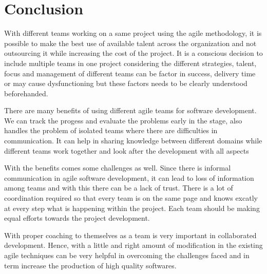 \documentclass[sigconf]{acmart}
\begin{document}
\section{Conclusion}
With different teams working on a same project using the agile methodology, it is possible to make the best use of available talent across the organization and not outsourcing it while increasing the cost of the project. It is a conscious decision to include multiple teams in one project considering the different strategies, talent, focus and management of different teams can be factor in success, delivery time or may cause dysfunctioning but these factors needs to be clearly understood beforehanded.

There are many benefits of using different agile teams for software development. We can track the progess and evaluate the problems early in the stage, also handles the problem of isolated teams where there are difficulties in communication. It can help in sharing knowledge between different domains while different teams work together and look after the development with all aspects

With the benefits comes some challenges as well. Since there is informal communication in agile software development, it can lead to loss of information among teams and with this there can be a lack of trust. There is a lot of coordination required so that every team is on the same page and knows excatly at every step what is happening within the project. Each team should be making equal efforts towards the project development.

With proper coaching to themselves as a team is very important in collaborated development\cite{4638656}. Hence, with a little and right amount of modification in the existing agile techniques can be very helpful in overcoming the challenges faced and in term increase the production of high quality softwares.



% 
%
\end{document}
